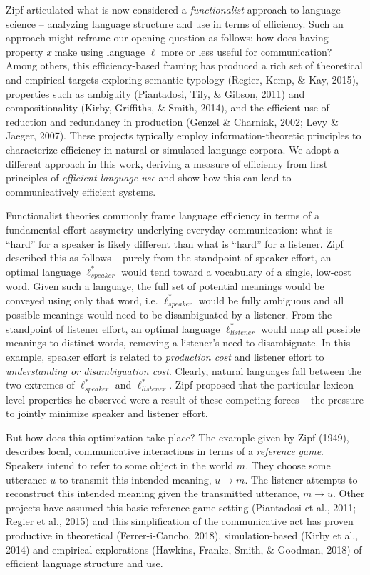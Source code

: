\documentclass[10pt, letterpaper]{article}
\begin{document}
Zipf articulated what is now considered a \emph{functionalist} approach
to language science -- analyzing language structure and use in terms of
efficiency. Such an approach might reframe our opening question as
follows: how does having property \textit{x} make using language
\(\ell\) more or less useful for communication? Among others, this
efficiency-based framing has produced a rich set of theoretical and
empirical targets exploring semantic typology (Regier, Kemp, \& Kay,
2015), properties such as ambiguity (Piantadosi, Tily, \& Gibson, 2011)
and compositionality (Kirby, Griffiths, \& Smith, 2014), and the
efficient use of reduction and redundancy in production (Genzel \&
Charniak, 2002; Levy \& Jaeger, 2007). These projects typically employ
information-theoretic principles to characterize efficiency in natural
or simulated language corpora. We adopt a different approach in this
work, deriving a measure of efficiency from first principles of
\textit{efficient language use} and show how this can lead to
communicatively efficient systems.\par

Functionalist theories commonly frame language efficiency in terms of a
fundamental effort-assymetry underlying everyday communication: what is
``hard'' for a speaker is likely different than what is ``hard'' for a
listener. Zipf described this as follows -- purely from the standpoint
of speaker effort, an optimal language \(\ell_{speaker}^*\) would tend
toward a vocabulary of a single, low-cost word. Given such a language,
the full set of potential meanings would be conveyed using only that
word, i.e. \(\ell_{speaker}^*\) would be fully ambiguous and all
possible meanings would need to be disambiguated by a listener. From the
standpoint of listener effort, an optimal language \(\ell_{listener}^*\)
would map all possible meanings to distinct words, removing a listener's
need to disambiguate. In this example, speaker effort is related to
\emph{production cost} and listener effort to \emph{understanding or
disambiguation cost}. Clearly, natural languages fall between the two
extremes of \(\ell_{speaker}^*\) and \(\ell_{listener}^*\). Zipf
proposed that the particular lexicon-level properties he observed were a
result of these competing forces -- the pressure to jointly minimize
speaker and listener effort.\par

But how does this optimization take place? The example given by Zipf
(1949), describes local, communicative interactions in terms of a
\textit{reference game}. Speakers intend to refer to some object in the
world \(m\). They choose some utterance \(u\) to transmit this intended
meaning, \(u \rightarrow m\). The listener attempts to reconstruct this
intended meaning given the transmitted utterance, \(m \rightarrow u\).
Other projects have assumed this basic reference game setting
(Piantadosi et al., 2011; Regier et al., 2015) and this simplification
of the communicative act has proven productive in theoretical
(Ferrer-i-Cancho, 2018), simulation-based (Kirby et al., 2014) and
empirical explorations (Hawkins, Franke, Smith, \& Goodman, 2018) of
efficient language structure and use.\par
\end{document}
